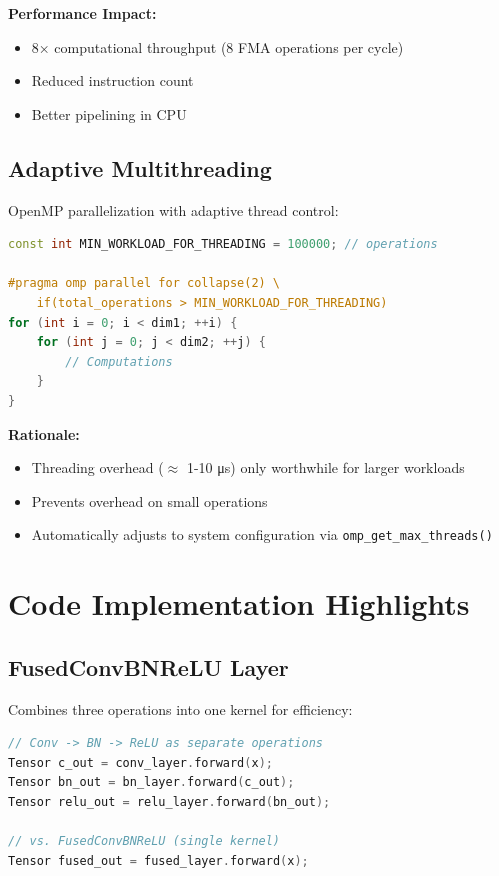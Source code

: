 \documentclass[12pt,oneside,a4paper]{report}
\begin{document}
\textbf{Performance Impact:}
\begin{itemize}
    \item 8× computational throughput (8 FMA operations per cycle)
    \item Reduced instruction count
    \item Better pipelining in CPU
\end{itemize}

\subsection{Adaptive Multithreading}

OpenMP parallelization with adaptive thread control:

\begin{lstlisting}[language=C++]
const int MIN_WORKLOAD_FOR_THREADING = 100000; // operations

#pragma omp parallel for collapse(2) \
    if(total_operations > MIN_WORKLOAD_FOR_THREADING)
for (int i = 0; i < dim1; ++i) {
    for (int j = 0; j < dim2; ++j) {
        // Computations
    }
}
\end{lstlisting}

\textbf{Rationale:}
\begin{itemize}
    \item Threading overhead ($\approx$ 1-10 μs) only worthwhile for larger workloads
    \item Prevents overhead on small operations
    \item Automatically adjusts to system configuration via \texttt{omp\_get\_max\_threads()}
\end{itemize}

\section{Code Implementation Highlights}

\subsection{FusedConvBNReLU Layer}

Combines three operations into one kernel for efficiency:

\begin{lstlisting}[language=C++]
// Conv -> BN -> ReLU as separate operations
Tensor c_out = conv_layer.forward(x);
Tensor bn_out = bn_layer.forward(c_out);
Tensor relu_out = relu_layer.forward(bn_out);

// vs. FusedConvBNReLU (single kernel)
Tensor fused_out = fused_layer.forward(x);
\end{lstlisting}
\end{document}
